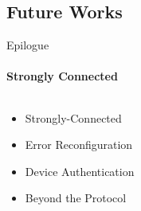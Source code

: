     \subsection{Future Works}
        \begin{frame}[t]{Epilogue}\framesubtitle{Strongly Connected}
            \begin{columns}[T]
                \begin{column}{0.48\textwidth}
                    \begin{itemize}
                        \item Strongly-Connected
                        \item Error Reconfiguration
                        \item Device Authentication
                        \item Beyond the Protocol
                    \end{itemize}
                \end{column}
            \begin{column}{.48\textwidth}
                \begin{figure}
                \end{figure}
            \end{column}
        \end{columns}
        \end{frame}